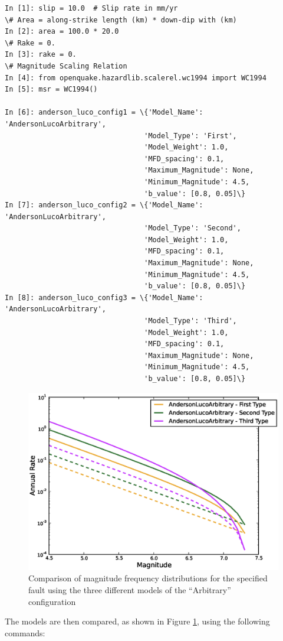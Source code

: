 \begin{Verbatim}[frame=single, commandchars=\\\{\}, fontsize=\scriptsize]
In [1]: slip = 10.0  # Slip rate in mm/yr
\# Area = along-strike length (km) * down-dip with (km)
In [2]: area = 100.0 * 20.0
\# Rake = 0.
In [3]: rake = 0.
\# Magnitude Scaling Relation
In [4]: from openquake.hazardlib.scalerel.wc1994 import WC1994
In [5]: msr = WC1994()

In [6]: anderson_luco_config1 = \{'Model_Name': 'AndersonLucoArbitrary',
                                 'Model_Type': 'First',
                                 'Model_Weight': 1.0,  
                                 'MFD_spacing': 0.1,
                                 'Maximum_Magnitude': None,
                                 'Minimum_Magnitude': 4.5,
                                 'b_value': [0.8, 0.05]\}
In [7]: anderson_luco_config2 = \{'Model_Name': 'AndersonLucoArbitrary',
                                 'Model_Type': 'Second',
                                 'Model_Weight': 1.0,
                                 'MFD_spacing': 0.1,
                                 'Maximum_Magnitude': None,
                                 'Minimum_Magnitude': 4.5,
                                 'b_value': [0.8, 0.05]\}
In [8]: anderson_luco_config3 = \{'Model_Name': 'AndersonLucoArbitrary',
                                 'Model_Type': 'Third',
                                 'Model_Weight': 1.0,   
                                 'MFD_spacing': 0.1,
                                 'Maximum_Magnitude': None,
                                 'Minimum_Magnitude': 4.5,
                                 'b_value': [0.8, 0.05]\}
\end{Verbatim}
\begin{figure}[htb]
  \centering
      \includegraphics[trim=5mm 5mm 5mm 5mm, clip, width=12cm]{./figures/anderson_luco_arbitrary_mfds.eps}
  \caption{Comparison of magnitude frequency distributions for the specified fault using the three different models of the \cite{AndersonLuco1983} ``Arbitrary'' configuration}
  \label{fig:anderson_luco_arb}
\end{figure}
The models are then compared, as shown in Figure \ref{fig:anderson_luco_arb}, using the following commands:


